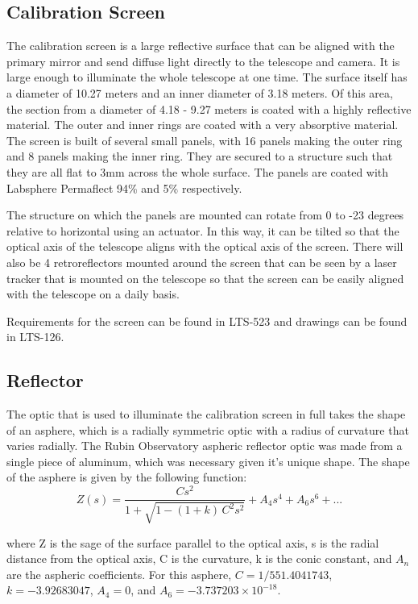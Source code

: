 \documentclass[SE,authoryear,lsstdraft,toc]{lsstdoc}
\begin{document}
\subsection{Calibration Screen}
The calibration screen is a large reflective surface that can be aligned with the primary mirror and send diffuse light directly to the telescope and camera. It is large enough to illuminate the whole telescope at one time. The surface itself has a diameter of 10.27 meters and an inner diameter of 3.18 meters. Of this area, the section from a diameter of 4.18 - 9.27 meters is coated with a highly reflective material. The outer and inner rings are coated with a very absorptive material. The screen is built of several small panels, with 16 panels making the outer ring and 8 panels making the inner ring. They are secured to a structure such that they are all flat to 3mm across the whole surface. The panels are coated with Labsphere Permaflect 94\% and 5\% respectively. 

The structure on which the panels are mounted can rotate from 0 to -23 degrees
relative to horizontal using an actuator. In this way, it can be tilted so that
the optical axis of the telescope aligns with the optical axis of the
screen. There will also be 4 retroreflectors mounted around the screen that can
be seen by a laser tracker that is mounted on the telescope so that the screen
can be easily aligned with the telescope on a daily basis.


Requirements for the screen can be found in LTS-523 and drawings can be found in LTS-126.

\subsection{Reflector}

The optic that is used to illuminate the calibration screen in full takes the
shape of an asphere, which is a radially symmetric optic with a radius of
curvature that varies radially. The Rubin Observatory aspheric reflector optic
was made from a single piece of aluminum, which was necessary given it's unique
shape. The shape of the asphere is given by the following function:
%
\begin{equation}
Z(s) = \frac{C s^{2}}{1+\sqrt{1-(1+k)\,C^{2}s^{2}}} + A_{4}s^{4} + A_{6}s^{6} + ...
\end{equation}


where Z is the sage of the surface parallel to the optical axis, s is the radial distance from the optical axis, C is the curvature, k is the conic constant, and $A_{n}$ are the aspheric coefficients.
 For this asphere, $C=1/551.4041743$, $k=-3.92683047$, $A_{4}=0$, and $A_{6} = -3.737203\times10^{-18}$.
\end{document}
